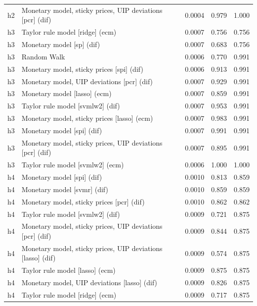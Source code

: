 \begin{ThreePartTable}
\begin{longtable}[t]{cp{5.5cm}ccc}
h2 & \raggedright Monetary model, sticky prices, UIP deviations [pcr] (dif) & 0.0004 & 0.979 & 1.000\\
\addlinespace
h3 & \raggedright Taylor rule model [ridge] (ecm) & 0.0007 & 0.756 & 0.756\\
h3 & \raggedright Monetary model [sp] (dif) & 0.0007 & 0.683 & 0.756\\
h3 & \raggedright Random Walk & 0.0006 & 0.770 & 0.991\\
h3 & \raggedright Monetary model, sticky prices [spi] (dif) & 0.0006 & 0.913 & 0.991\\
h3 & \raggedright Monetary model, UIP deviations [pcr] (dif) & 0.0007 & 0.929 & 0.991\\
h3 & \raggedright Monetary model [lasso] (ecm) & 0.0007 & 0.859 & 0.991\\
h3 & \raggedright Taylor rule model [svmlw2] (dif) & 0.0007 & 0.953 & 0.991\\
h3 & \raggedright Monetary model, sticky prices [lasso] (ecm) & 0.0007 & 0.983 & 0.991\\
h3 & \raggedright Monetary model [spi] (dif) & 0.0007 & 0.991 & 0.991\\
h3 & \raggedright Monetary model, sticky prices, UIP deviations [pcr] (dif) & 0.0007 & 0.895 & 0.991\\
h3 & \raggedright Taylor rule model [svmlw2] (ecm) & 0.0006 & 1.000 & 1.000\\
\addlinespace
h4 & \raggedright Monetary model [spi] (dif) & 0.0010 & 0.813 & 0.859\\
h4 & \raggedright Monetary model [svmr] (dif) & 0.0010 & 0.859 & 0.859\\
h4 & \raggedright Monetary model, sticky prices [pcr] (dif) & 0.0010 & 0.862 & 0.862\\
h4 & \raggedright Taylor rule model [svmlw2] (dif) & 0.0009 & 0.721 & 0.875\\
h4 & \raggedright Monetary model, sticky prices, UIP deviations [pcr] (dif) & 0.0009 & 0.844 & 0.875\\
h4 & \raggedright Monetary model, sticky prices, UIP deviations [lasso] (dif) & 0.0009 & 0.574 & 0.875\\
h4 & \raggedright Taylor rule model [lasso] (ecm) & 0.0009 & 0.875 & 0.875\\
h4 & \raggedright Monetary model, UIP deviations [lasso] (dif) & 0.0009 & 0.826 & 0.875\\
h4 & \raggedright Taylor rule model [ridge] (ecm) & 0.0009 & 0.717 & 0.875\\

\end{longtable}
\end{ThreePartTable}
